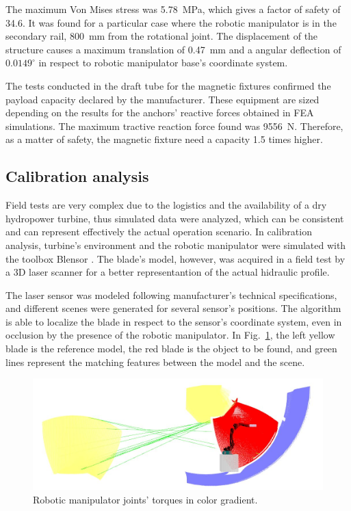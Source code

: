 The maximum Von Mises stress was 5.78~MPa, which gives a factor of safety of
34.6. It was found for a particular case where the robotic manipulator is in
the secondary rail, 800~mm from the rotational joint. The displacement of the
structure causes a maximum translation of 0.47~mm and a angular deflection of
$0.0149^{\circ}$ in respect to robotic manipulator base's coordinate system. 

The tests conducted in the draft tube for the magnetic fixtures confirmed the
payload capacity declared by the manufacturer. These equipment are sized
depending on the results for the anchors' reactive forces obtained in FEA
simulations. The maximum tractive reaction force found was 9556~N.
Therefore, as a matter of safety, the magnetic fixture need a capacity 1.5 times
higher.


\subsection{Calibration analysis}

Field tests are very complex due to the logistics and the availability of a dry
hydropower turbine, thus simulated data were analyzed, which can be consistent
and can represent effectively the actual operation scenario. In calibration
analysis, turbine's environment and the robotic manipulator were simulated with
the toolbox Blensor \cite{Gschwandtner11b}. The blade's model, however, was
acquired in a field test by a 3D laser scanner for a better representantion of
the actual hidraulic profile.

The laser sensor was modeled following manufacturer's technical
specifications, and different scenes were generated for several sensor's
positions. The algorithm is able to localize the blade in respect to the
sensor's coordinate system, even in occlusion by the presence of the robotic
manipulator. In Fig.~\ref{fig:calibration}, the left yellow blade is the
reference model, the red blade is the object to be found, and green lines
represent the matching features between the model and the scene.

\begin{figure}
	\centering
	\includegraphics[width=.95\columnwidth]{figs/results/sim_mh12_sp}
    \caption{Robotic manipulator joints' torques in color gradient.}
    \label{fig:calibration}
\end{figure}